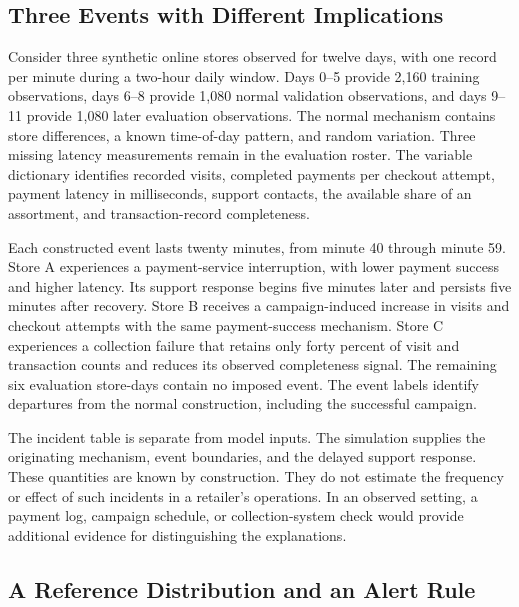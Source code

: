 \hypertarget{M07-three-events-with-different-implications}{%
\subsection{Three Events with Different
Implications}\label{M07-three-events-with-different-implications}}

\noindent \noindent Consider three synthetic online stores observed for twelve
days, with one record per minute during a two-hour daily window. Days
0--5 provide 2,160 training observations, days 6--8 provide 1,080 normal
validation observations, and days 9--11 provide 1,080 later evaluation
observations. The normal mechanism contains store differences, a known
time-of-day pattern, and random variation. Three missing latency
measurements remain in the evaluation roster. The variable dictionary
identifies recorded visits, completed payments per checkout attempt,
payment latency in milliseconds, support contacts, the available share
of an assortment, and transaction-record completeness.

Each constructed event lasts twenty minutes, from minute 40 through
minute 59. Store A experiences a payment-service interruption, with
lower payment success and higher latency. Its support response begins
five minutes later and persists five minutes after recovery. Store B
receives a campaign-induced increase in visits and checkout attempts
with the same payment-success mechanism. Store C experiences a
collection failure that retains only forty percent of visit and
transaction counts and reduces its observed completeness signal. The
remaining six evaluation store-days contain no imposed event. The event
labels identify departures from the normal construction, including the
successful campaign.

The incident table is separate from model inputs. The simulation
supplies the originating mechanism, event boundaries, and the delayed
support response. These quantities are known by construction. They do
not estimate the frequency or effect of such incidents in a retailer's
operations. In an observed setting, a payment log, campaign schedule, or
collection-system check would provide additional evidence for
distinguishing the explanations.

\hypertarget{M07-a-reference-distribution-and-an-alert-rule}{%
\subsection{A Reference Distribution and an Alert
Rule}\label{M07-a-reference-distribution-and-an-alert-rule}}

